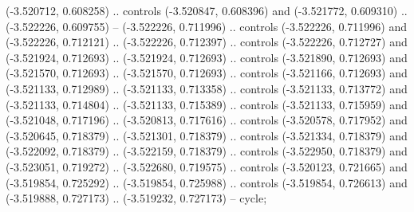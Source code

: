     (-3.520712, 0.608258) .. controls (-3.520847, 0.608396) and (-3.521772, 0.609310) ..
    (-3.522226, 0.609755) --
    (-3.522226, 0.711996) .. controls (-3.522226, 0.711996) and (-3.522226, 0.712121) ..
    (-3.522226, 0.712397) .. controls (-3.522226, 0.712727) and (-3.521924, 0.712693) ..
    (-3.521924, 0.712693) .. controls (-3.521890, 0.712693) and (-3.521570, 0.712693) ..
    (-3.521570, 0.712693) .. controls (-3.521166, 0.712693) and (-3.521133, 0.712989) ..
    (-3.521133, 0.713358) .. controls (-3.521133, 0.713772) and (-3.521133, 0.714804) ..
    (-3.521133, 0.715389) .. controls (-3.521133, 0.715959) and (-3.521048, 0.717196) ..
    (-3.520813, 0.717616) .. controls (-3.520578, 0.717952) and (-3.520645, 0.718379) ..
    (-3.521301, 0.718379) .. controls (-3.521334, 0.718379) and (-3.522092, 0.718379) ..
    (-3.522159, 0.718379) .. controls (-3.522950, 0.718379) and (-3.523051, 0.719272) ..
    (-3.522680, 0.719575) .. controls (-3.520123, 0.721665) and (-3.519854, 0.725292) ..
    (-3.519854, 0.725988) .. controls (-3.519854, 0.726613) and (-3.519888, 0.727173) ..
    (-3.519232, 0.727173) --
    cycle;

